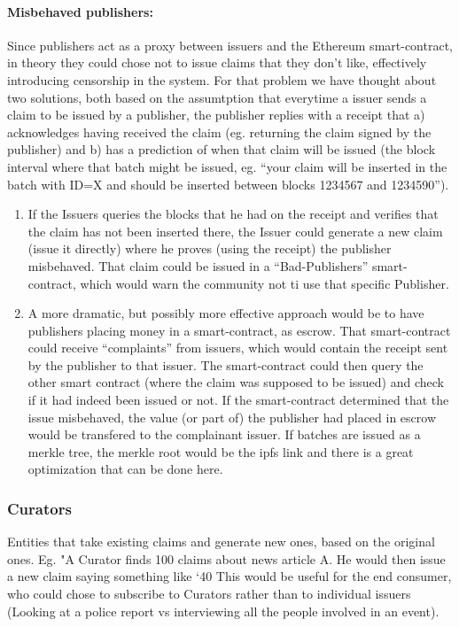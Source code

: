 \documentclass[letterpaper,twocolumn,10pt]{article}
\begin{document}
\paragraph{Misbehaved publishers: } Since publishers act as a proxy between issuers and the Ethereum smart-contract, in theory they could chose not to issue claims that they don’t like, effectively introducing censorship in the system. For that problem we have thought about two solutions, both based on the assumtption that everytime a issuer sends a claim to be issued by a publisher, the publisher replies with a receipt that a) acknowledges having received the claim (eg. returning the claim signed by the publisher) and b) has a prediction of when that claim will be issued (the block interval where that batch might be issued, eg. “your claim will be inserted in the batch with ID=X and should be inserted between blocks 1234567 and 1234590”).
\begin{enumerate}
    \item If the Issuers queries the blocks that he had on the receipt and verifies that the claim has not been inserted there, the Issuer could generate a new claim (issue it directly) where he proves (using the receipt) the publisher misbehaved. That claim could be issued in a “Bad-Publishers” smart-contract, which would warn the community not ti use that specific Publisher.
    \item A more dramatic, but possibly more effective approach would be to have publishers placing money in a smart-contract, as escrow. That smart-contract could receive “complaints” from issuers, which would contain the receipt sent by the publisher to that issuer. The smart-contract could then query the other smart contract (where the claim was supposed to be issued) and check if it had indeed been issued or not. If the smart-contract determined that the issue misbehaved, the value (or part of) the publisher had placed in escrow would be transfered to the complainant issuer. If batches are issued as a merkle tree, the merkle root would be the ipfs link and there is a great optimization that can be done here.
\end{enumerate}

\subsubsection{Curators}
Entities that take existing claims and generate new ones, based on the original ones.
Eg. "A Curator finds 100 claims about news article A. He would then issue a new claim saying something like ‘40%
This would be useful for the end consumer, who could chose to subscribe to Curators rather than to individual issuers (Looking at a police report vs interviewing all the people involved in an event).
\end{document}
